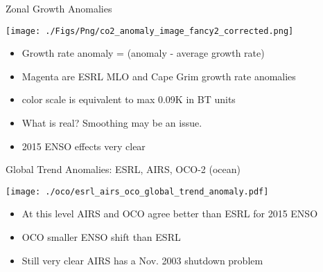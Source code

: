 \documentclass[10pt,t]{beamer}
\begin{document}
\begin{frame}[label={sec:orgff8737e}]{Zonal \cd Growth Anomalies}
\vspace{-0.1in}

\begin{center}
\texttt{[image: ./Figs/Png/co2\_anomaly\_image\_fancy2\_corrected.png]}
\end{center}

\begin{footnotesize}
\begin{itemize}
\item Growth rate anomaly = (\cd anomaly - \cd average growth rate)
\item Magenta are ESRL MLO and Cape Grim \cd growth rate anomalies
\item \cd color scale is equivalent to max \textpm{} 0.09K in BT units
\item What is real?  Smoothing may be an issue.
\item 2015 ENSO effects very clear
\end{itemize}
\end{footnotesize}
\end{frame}

\begin{frame}[label={sec:org9c5731f}]{Global Trend Anomalies: ESRL, AIRS, OCO-2 (ocean)}
\vspace{-0.1in}
\begin{center}
\texttt{[image: ./oco/esrl\_airs\_oco\_global\_trend\_anomaly.pdf]}
\end{center}
\small
\begin{itemize}
\item At this level AIRS and OCO agree better than ESRL for 2015 ENSO
\item OCO smaller ENSO shift than ESRL
\item Still very clear AIRS has a Nov. 2003 shutdown problem
\end{itemize}
\end{frame}
\end{document}
